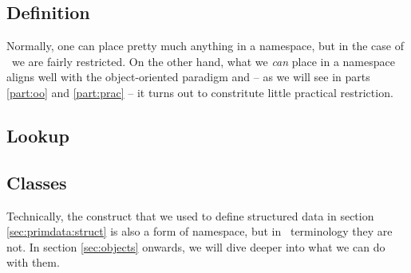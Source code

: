 
\subsection{Definition}

Normally, one can place pretty much anything in a namespace, but in the case of \csharp\ we are fairly restricted. On the other hand, what we \textsl{can} place in a namespace aligns well with the object-oriented paradigm and -- as we will see in parts \ref{part:oo} and \ref{part:prac} -- it turns out to constritute little practical restriction.





\subsection{Lookup}





\subsection{Classes}

Technically, the  construct that we used to define structured data in section \ref{sec:primdata:struct} is also a form of namespace, but in \csharp\ terminology they are not. In section \ref{sec:objects} onwards, we will dive deeper into what we can do with them.

